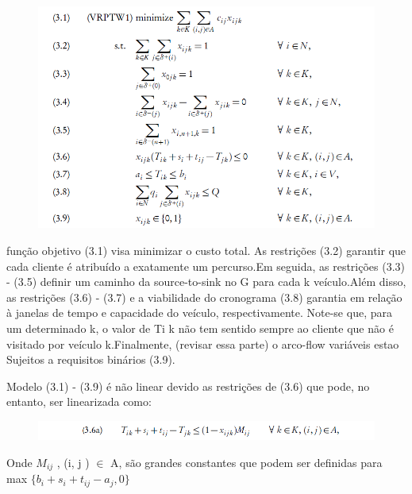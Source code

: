 \begin{figure}[ht!]
\centering
\includegraphics[scale=0.8]{figuras/math1.PNG}
\label{math1}
\end{figure}



função objetivo (3.1) visa minimizar o custo total. As restrições (3.2) garantir que cada cliente é atribuído a exatamente um percurso.Em seguida, as restrições (3.3) - (3.5) definir um caminho da source-to-sink no G para cada k veículo.Além disso, as restrições (3.6) - (3.7) e a viabilidade do cronograma (3.8) garantia em relação à janelas de tempo e capacidade do veículo, respectivamente. Note-se que, para um determinado k, o valor de Ti k não tem sentido sempre ao cliente que não é visitado por veículo k.Finalmente, (revisar essa parte) o arco-flow variáveis estao Sujeitos a requisitos binários (3.9).

Modelo (3.1) - (3.9) é não linear devido as restrições de (3.6) que pode, no entanto, ser linearizada como: 

\begin{figure}[ht!]
\centering
\includegraphics[scale=0.8]{figuras/math6.PNG}
\label{math6}
\end{figure}

Onde $ M_{ij}$ , (i, j ) $\in$ A, são grandes constantes que podem ser definidas para max $ \{b_i + s_i +t_{ij} - a_j , 0 \}$



